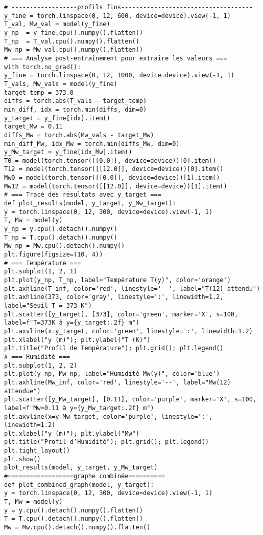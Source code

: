 \documentclass[12pt, oneside]{report} %
\theoremstyle{definition}
\theoremstyle{remark}
\begin{document}
\begin{lstlisting}[style=pythonstyle]
# ------------------profils fins------------------------------------
y_fine = torch.linspace(0, 12, 600, device=device).view(-1, 1)
T_val, Mw_val = model(y_fine)
y_np  = y_fine.cpu().numpy().flatten()
T_np  = T_val.cpu().numpy().flatten()
Mw_np = Mw_val.cpu().numpy().flatten()
# === Analyse post-entraînement pour extraire les valeurs ===
with torch.no_grad():
y_fine = torch.linspace(0, 12, 1000, device=device).view(-1, 1)
T_vals, Mw_vals = model(y_fine)
target_temp = 373.0
diffs = torch.abs(T_vals - target_temp)
min_diff, idx = torch.min(diffs, dim=0)
y_target = y_fine[idx].item()
target_Mw = 0.11
diffs_Mw = torch.abs(Mw_vals - target_Mw)
min_diff_Mw, idx_Mw = torch.min(diffs_Mw, dim=0)
y_Mw_target = y_fine[idx_Mw].item()
T0 = model(torch.tensor([[0.0]], device=device))[0].item()
T12 = model(torch.tensor([[12.0]], device=device))[0].item()
Mw0 = model(torch.tensor([[0.0]], device=device))[1].item()
Mw12 = model(torch.tensor([[12.0]], device=device))[1].item()
# === Tracé des résultats avec y_target ===
def plot_results(model, y_target, y_Mw_target):
y = torch.linspace(0, 12, 300, device=device).view(-1, 1)
T, Mw = model(y)
y_np = y.cpu().detach().numpy()
T_np = T.cpu().detach().numpy()
Mw_np = Mw.cpu().detach().numpy()
plt.figure(figsize=(10, 4))
# === Température ===
plt.subplot(1, 2, 1)
plt.plot(y_np, T_np, label="Température T(y)", color='orange')
plt.axhline(T_inf, color='red', linestyle='--', label="T(12) attendu")
plt.axhline(373, color='gray', linestyle=':', linewidth=1.2, label="Seuil T = 373 K")
plt.scatter([y_target], [373], color='green', marker='X', s=100, label=f"T=373K à y={y_target:.2f} m")
plt.axvline(x=y_target, color='green', linestyle=':', linewidth=1.2)
plt.xlabel("y (m)"); plt.ylabel("T (K)")
plt.title("Profil de Température"); plt.grid(); plt.legend()
# === Humidité ===
plt.subplot(1, 2, 2)
plt.plot(y_np, Mw_np, label="Humidité Mw(y)", color='blue')
plt.axhline(Mw_inf, color='red', linestyle='--', label="Mw(12) attendue")
plt.scatter([y_Mw_target], [0.11], color='purple', marker='X', s=100, label=f"Mw=0.11 à y={y_Mw_target:.2f} m")
plt.axvline(x=y_Mw_target, color='purple', linestyle=':', linewidth=1.2)
plt.xlabel("y (m)"); plt.ylabel("Mw")
plt.title("Profil d’Humidité"); plt.grid(); plt.legend()
plt.tight_layout()
plt.show()
plot_results(model, y_target, y_Mw_target)
#==================graphe combinée==========
def plot_combined_graph(model, y_target):
y = torch.linspace(0, 12, 300, device=device).view(-1, 1)
T, Mw = model(y)
y = y.cpu().detach().numpy().flatten()
T = T.cpu().detach().numpy().flatten()
Mw = Mw.cpu().detach().numpy().flatten()

\end{lstlisting}
\end{document}
